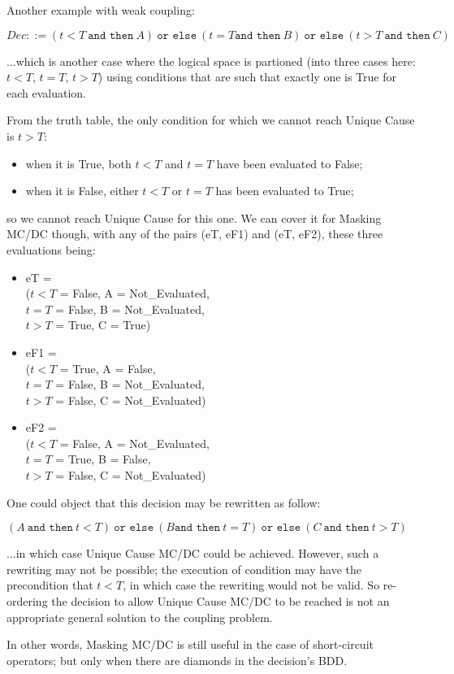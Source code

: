 \documentclass[a4paper,12pt,twoside]{article}
\newcommand{\andthen}{\texttt{and then}}
\newcommand{\orelse}{\texttt{or else}}
\begin{document}
Another example with weak coupling:

$Dec ::= (t < T \ \andthen{} \ A)
  \ \orelse{} \ (t = T \andthen{} \ B)
  \ \orelse{} \ (t > T \ \andthen{} \ C)$

...which is another case where the logical space is partioned (into three
cases here: $t < T$, $t = T$, $t > T$) using conditions that are such
that exactly one is True for each evaluation.

From the truth table, the only condition for which we cannot reach
Unique Cause is $t > T$:
\begin{itemize}
\item when it is True, both $t < T$ and $t = T$ have been evaluated to False;
\item when it is False, either $t < T$ or $t = T$ has been evaluated to True;
\end{itemize}
so we cannot reach Unique Cause for this one. We can cover it for
Masking MC/DC though, with any of the pairs (eT, eF1) and
(eT, eF2), these three evaluations being:
\begin{itemize}
\item eT = \\
($t < T$ = False, A = Not\_Evaluated,\\
 $t = T$ = False, B = Not\_Evaluated,\\
 $t > T$ = True,  C = True)

\item eF1 = \\
($t < T$ = True,  A = False,\\
 $t = T$ = False, B = Not\_Evaluated,\\
 $t > T$ = False, C = Not\_Evaluated)

\item eF2 = \\
($t < T$ = False, A = Not\_Evaluated,\\
 $t = T$ = True,  B = False,\\
 $t > T$ = False, C = Not\_Evaluated)
\end{itemize}

One could object that this decision may be rewritten as follow:

$(A \ \andthen{} \ t < T)
  \ \orelse{} \ (B \andthen{} \ t = T)
  \ \orelse{} \ (C \ \andthen{} \ t > T)$

...in which case Unique Cause MC/DC could be achieved. However, such a
rewriting may not be possible; the execution of condition may have the
precondition that $t < T$, in which case the rewriting would not be
valid. So re-ordering the decision to allow Unique Cause MC/DC to be
reached is not an appropriate general solution to the coupling
problem.

In other words, Masking MC/DC is still useful in the case of
short-circuit operators; but only when there are diamonds in the
decision's BDD.

\newpage


\end{document}
